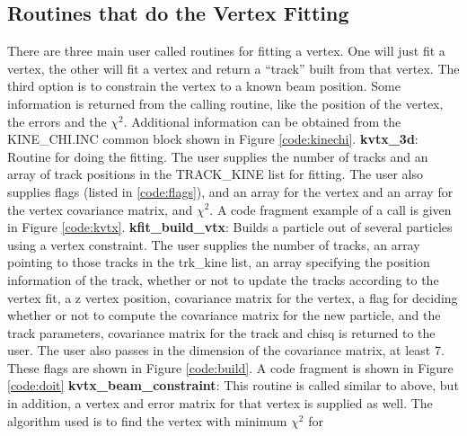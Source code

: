 \subsection{Routines that do the Vertex Fitting}

There are three main user called routines for fitting a vertex.  One will just
fit a vertex, the other will fit a vertex and return a ``track'' built from
that vertex. The third option is to constrain the vertex to a known beam
position.
 Some information is returned from the calling routine, like the
position of the vertex, the errors and the $\chi^2$.  Additional information
can be obtained from the {\small KINE\_CHI.INC} common block shown in Figure
\ref{code:kinechi}.\nextline\nextline
{\bf kvtx\_3d}: Routine for doing the fitting.  The user supplies the
                    number of tracks and an array of track positions in 
                    the {\small TRACK\_KINE} list for fitting.
                    The user also supplies flags (listed in \ref{code:flags}),
                    and an
                    array for the vertex and an array for the vertex covariance
                    matrix, and $\chi^2$.  A code fragment example of a call is
                    given in Figure \ref{code:kvtx}.\nextline \nextline
{\bf kfit\_build\_vtx}:  Builds a particle out of several particles using a 
                   vertex constraint.  The user supplies the number of tracks,
                   an array pointing to those tracks in the trk\_kine list, an 
                   array specifying the position information of the track, 
                   whether or not to update the tracks according to
                   the vertex fit, a z vertex position, 
                   covariance matrix for the vertex, a flag for deciding
                   whether or not to compute the covariance matrix for the new 
                   particle, and the track parameters, covariance matrix for 
                   the track and chisq is returned to the user.  The user 
                   also passes in the dimension of the covariance matrix, at 
                   least 7. These flags are shown in Figure \ref{code:build}.
                   A code fragment is shown in Figure \ref{code:doit}
                   \nextline\nextline
{\bf kvtx\_beam\_constraint}:  This routine is called similar to above, but in
                             addition, a vertex and error matrix for that
                             vertex is supplied as well.  The algorithm used is
                             to find the vertex with minimum $\chi^2$ for
